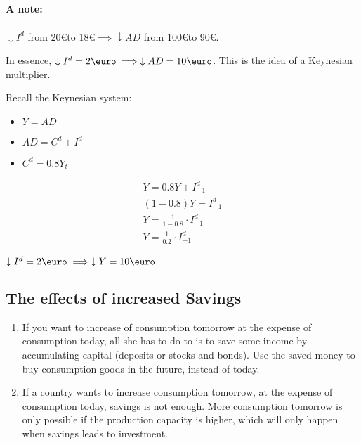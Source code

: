 \documentclass{report}
\begin{document}



\paragraph{A note:}

$\downarrow I^d$ from 20\euro to 18\euro $\implies \downarrow AD$ from 100\euro  to 90\euro. 

In essence, $\downarrow I^d=2\text{\euro}\implies \downarrow AD=10\text{\euro}$. This is the idea of a Keynesian multiplier. 

Recall the Keynesian system: 
\begin{itemize}
    \item $Y=AD$
    \item $AD=C^d+I^d$
    \item $C^d=0.8Y_t$
\end{itemize}

\begin{equation*}
    \begin{aligned}
        Y=0.8Y+I^d_{-1} \\
        (1-0.8)Y=I^d_{-1}\\
        Y=\frac{1}{1-0.8}\cdot I^d_{-1} \\
        Y=\frac{1}{0.2}\cdot I_{-1}^d
    \end{aligned}
\end{equation*}

$\downarrow I^d=2\text{\euro} \implies \downarrow Y=10\text{\euro}$

\subsection{The effects of increased Savings}
\begin{enumerate}
    \item If you want to increase of consumption tomorrow at the expense of consumption today, all she has to do to is to save some income by accumulating capital (deposits or stocks and bonds). Use the saved money to buy consumption goods in the future, instead of today.
    \item If a country wants to increase consumption tomorrow, at the expense of consumption today, savings is not enough. More consumption tomorrow is only possible if the production capacity is higher, which will only happen when savings leads to investment.  
\end{enumerate}
\end{document}
